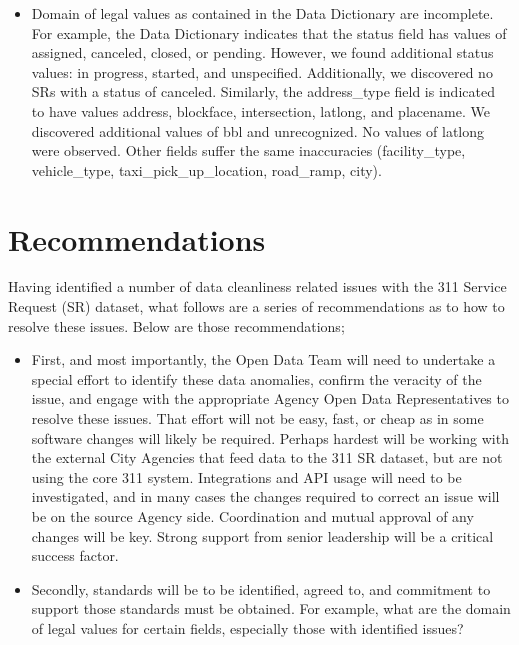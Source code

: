 \documentclass[12pt, titlepage]{article}
\begin{document}
{\begin{itemize}
	\item Domain of legal values as contained in the Data Dictionary are incomplete. For example, the Data Dictionary indicates
	that the status field has values of assigned, canceled, closed, or pending. However, we found additional status values:
	in progress, started, and unspecified. Additionally, we discovered no SRs with a status of canceled. Similarly, the 
	address\_type field is indicated to have values address, blockface, intersection, latlong, and placename. We discovered
	additional values of bbl and unrecognized. No values of latlong were observed. Other fields suffer the same
	inaccuracies (facility\_type, vehicle\_type, taxi\_pick\_up\_location, road\_ramp, city).
\end{itemize}



\section{Recommendations} \label{sec:recommendations}
Having identified a number of data cleanliness related issues with the 311 Service Request (SR) dataset, what follows
are a series of recommendations as to how to resolve these issues. Below are those recommendations;

\begin{itemize}
	\item First, and most importantly, the Open Data Team will need to undertake a special effort to identify these data anomalies,
	confirm the veracity of the issue, and engage with the appropriate Agency Open Data Representatives to resolve these issues.
	That effort will not be easy, fast, or cheap as in some software changes will likely be required. Perhaps hardest will be
	working with the external City Agencies that feed data to the 311 SR dataset, but are not using the core 311 system.
	Integrations and API usage will need to be investigated, and in many cases the changes required to correct an issue will
	be on the source Agency side. Coordination and mutual approval of any changes will be key. Strong support from senior
	leadership will be a critical success factor.

	\item Secondly, standards will be to be identified, agreed to, and commitment to support those standards must be
	obtained. For example, what are the domain of legal values for certain fields, especially those with identified issues?


\end{itemize}}
\end{document}
